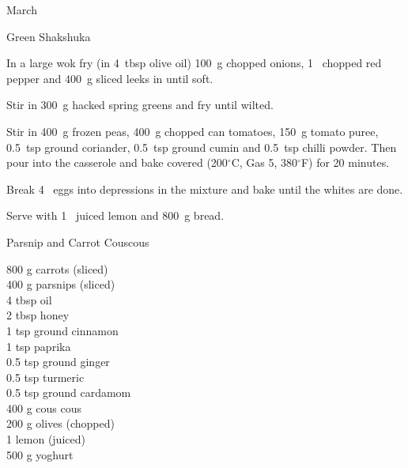 \begin{menu}{March}
\begin{recipe}{2}{Green Shakshuka}
    \begin{instructions}
    \item 
        In a large wok fry
        (in 4~tbsp  olive oil)
        100~g chopped onions,
        1~ chopped red pepper
        and
        400~g sliced leeks
        in until soft.
      \item 
        Stir in 300~g hacked spring greens
        and fry until wilted.
      \item 
        Stir in 400~g  frozen peas,
        400~g chopped can tomatoes,
        150~g  tomato puree,
        0.5~tsp  ground coriander,
        0.5~tsp  ground cumin
        and
        0.5~tsp  chilli powder.
        Then pour into the casserole
        and bake covered (200$^{\circ}$C, Gas 5, 380$^{\circ}$F) for 20 minutes.
      \item 
        Break 4~  eggs into depressions in the mixture
        and bake until the whites are done.
      \item 
        Serve with
        1~ juiced lemon
        and
        800~g  bread.
      
    \end{instructions}
    \end{recipe}%
  
    \begin{recipe}{2}{Parsnip and Carrot Couscous}%
		\begin{ingredients}
		800 g carrots (sliced) \\
	400 g parsnips (sliced) \\
	4 tbsp oil  \\
	2 tbsp honey  \\
	1 tsp ground cinnamon  \\
	1 tsp paprika  \\
	0.5 tsp ground ginger  \\
	0.5 tsp turmeric  \\
	0.5 tsp ground cardamom  \\
	400 g cous cous  \\
	200 g olives (chopped) \\
	1  lemon (juiced) \\
	500 g yoghurt  \\
	
		\end{ingredients}
	
	

\end{recipe}
\end{menu}
